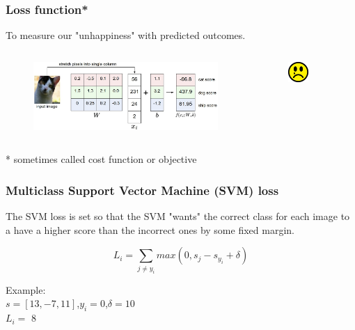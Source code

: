 \begin{frame}
	\frametitle{Loss function*}

	\vskip 0.5cm

	To measure our "unhappiness" with predicted outcomes.

	\begin{columns}
        	\begin{figure}
                	\includegraphics[width=1\textwidth]{Pics/imagemap.jpg}
        	\end{figure}
		\pause
                \begin{figure}
                        \includegraphics[width=0.5\textwidth]{Pics/unhappy.png}
                \end{figure}
	\end{columns}	

	\vskip 1.5cm
	\small{* sometimes called cost function or objective}

\end{frame}

\begin{frame}
	\frametitle{Multiclass Support Vector Machine (SVM) loss}

	The SVM loss is set so that the SVM "wants" the correct class for each image to a have a higher score than the incorrect ones by some fixed margin.

	\begin{equation*}
		L_i = \sum_{j \neq y_i} max (0, s_j-s_{y_i} + \delta)
	\end{equation*}

	Example:\\
	$s=[13,-7,11]$,$y_i=0$,$\delta=10$\\
	$L_i = $ \pause $8$	

\end{frame}

